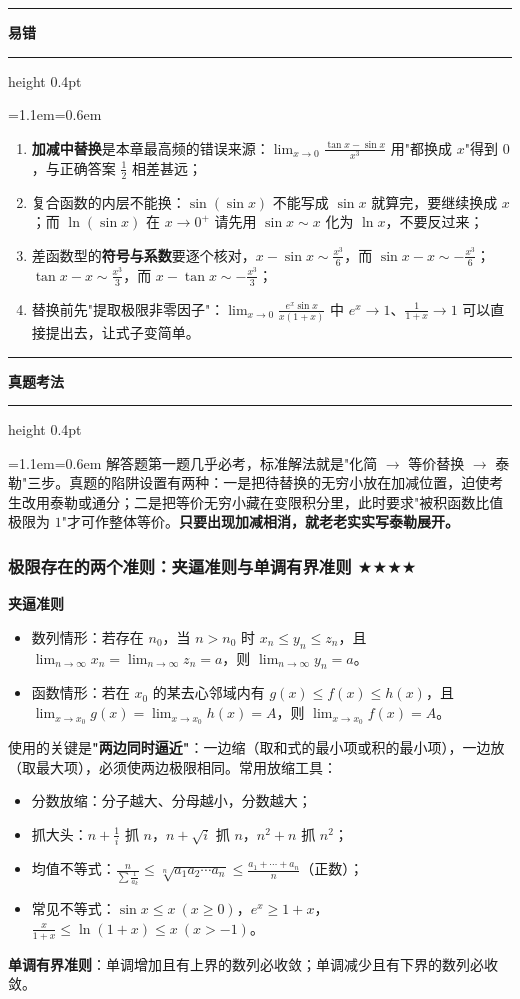 \documentclass[11pt,openany,UTF8]{ctexbook}
\newcommand{\callouthead}[2]{%
  \par\addvspace{7pt}\noindent
  {\color{#1}\rule[-0.15em]{3pt}{1.05em}}\hspace{0.5em}%
  {\bfseries\color{#1}#2}\par\nobreak\vspace{-0.35em}%
  {\color{rulesep}\hrule height 0.4pt}\nobreak\vspace{0.45em}%
  \begingroup\small\setlength{\parindent}{0pt}%
  \leftskip=1.1em\rightskip=0.6em\noindent\ignorespaces}
\newcommand{\calloutend}{\par\endgroup\addvspace{7pt}}
\newenvironment{callwarn}[1]{\callouthead{warnbar}{#1}}{\calloutend}
\newenvironment{callexam}[1]{\callouthead{exambar}{#1}}{\calloutend}
\begin{document}
\begin{callwarn}{易错}
\begin{enumerate}
\item \textbf{加减中替换}是本章最高频的错误来源：$\lim_{x\to 0}\frac{\tan x-\sin x}{x^3}$ 用"都换成 $x$"得到 $0$，与正确答案 $\frac12$ 相差甚远；
\item 复合函数的内层不能换：$\sin(\sin x)$ 不能写成 $\sin x$ 就算完，要继续换成 $x$；而 $\ln(\sin x)$ 在 $x\to 0^+$ 请先用 $\sin x\sim x$ 化为 $\ln x$，不要反过来；
\item 差函数型的\textbf{符号与系数}要逐个核对，$x-\sin x\sim\frac{x^3}{6}$，而 $\sin x-x\sim-\frac{x^3}{6}$；$\tan x-x\sim\frac{x^3}{3}$，而 $x-\tan x\sim-\frac{x^3}{3}$；
\item 替换前先"提取极限非零因子"：$\lim_{x\to 0}\frac{e^x\sin x}{x(1+x)}$ 中 $e^x\to 1$、$\frac{1}{1+x}\to 1$ 可以直接提出去，让式子变简单。
\end{enumerate}
\end{callwarn}

\begin{callexam}{真题考法}
解答题第一题几乎必考，标准解法就是"化简 $\to$ 等价替换 $\to$ 泰勒"三步。真题的陷阱设置有两种：一是把待替换的无穷小放在加减位置，迫使考生改用泰勒或通分；二是把等价无穷小藏在变限积分里，此时要求"被积函数比值极限为 $1$"才可作整体等价。\textbf{只要出现加减相消，就老老实实写泰勒展开。}

\end{callexam}

\subsubsection{极限存在的两个准则：夹逼准则与单调有界准则 $\bigstar$$\bigstar$$\bigstar$$\bigstar$}

\textbf{夹逼准则}

\begin{itemize}
\item 数列情形：若存在 $n_0$，当 $n>n_0$ 时 $x_n\le y_n\le z_n$，且 $\lim_{n\to\infty}x_n=\lim_{n\to\infty}z_n=a$，则 $\lim_{n\to\infty}y_n=a$。
\item 函数情形：若在 $x_0$ 的某去心邻域内有 $g(x)\le f(x)\le h(x)$，且 $\lim_{x\to x_0}g(x)=\lim_{x\to x_0}h(x)=A$，则 $\lim_{x\to x_0}f(x)=A$。
\end{itemize}
使用的关键是\textbf{"两边同时逼近"}：一边缩（取和式的最小项或积的最小项），一边放（取最大项），必须使两边极限相同。常用放缩工具：

\begin{itemize}
\item 分数放缩：分子越大、分母越小，分数越大；
\item 抓大头：$n+\frac1i$ 抓 $n$，$n+\sqrt i$ 抓 $n$，$n^2+n$ 抓 $n^2$；
\item 均值不等式：$\frac{n}{\sum\frac{1}{a_k}}\le\sqrt[n]{a_1a_2\cdots a_n}\le\frac{a_1+\cdots+a_n}{n}$（正数）；
\item 常见不等式：$\sin x\le x\ (x\ge 0)$，$e^{x}\ge 1+x$，$\frac{x}{1+x}\le\ln(1+x)\le x\ (x>-1)$。
\end{itemize}
\textbf{单调有界准则}：单调增加且有上界的数列必收敛；单调减少且有下界的数列必收敛。
\end{document}
